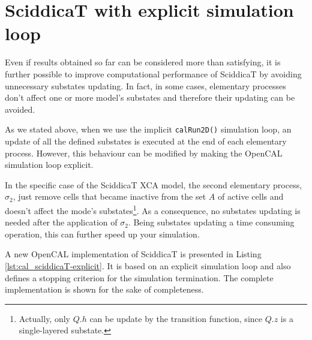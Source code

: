\section{SciddicaT with explicit simulation loop}
Even if results obtained so far can be considered more than
satisfying, it is further possible to improve computational
performance of SciddicaT by avoiding unnecessary substates
updating. In fact, in some cases, elementary processes don't affect
one or more model's substates and therefore their updating can be avoided.

As we stated above, when we use the implicit \verb'calRun2D()'
simulation loop, an update of all the defined substates is executed at
the end of each elementary process. However, this behaviour can be
modified by making the OpenCAL simulation loop explicit.

In the specific case of the SciddicaT XCA model, the second elementary
process, $\sigma_2$, just remove cells that became inactive from the
set $A$ of active cells and doesn't affect the mode's
substates\footnote{Actually, only $Q.h$ can be update by the
  transition function, since $Q.z$ is a single-layered substate.}. As a
consequence, no substates updating is needed after the application of
$\sigma_2$. Being substates updating a time consuming operation, this
can further speed up your simulation.

A new OpenCAL implementation of SciddicaT is presented in Listing
\ref{lst:cal_sciddicaT-explicit}. It is based on an explicit
simulation loop and also defines a stopping criterion for the
simulation termination. The complete implementation is shown for the
sake of completeness.





